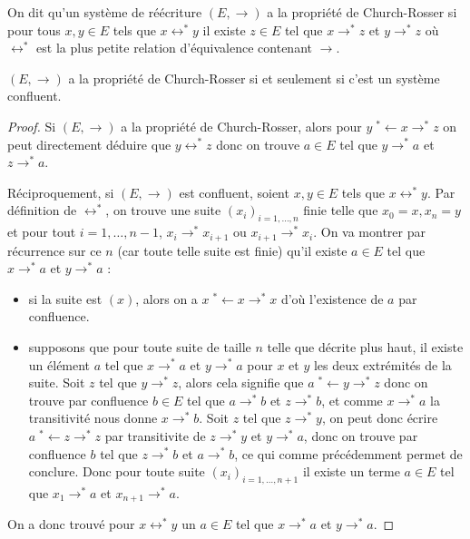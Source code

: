 \begin{defi}
    On dit qu'un système de réécriture $(E,\to)$ a la propriété de Church-Rosser si pour tous $x,y\in E$ tels que $x\leftrightarrow^* y$ il existe $z\in E$ tel que $x\to^* z$ et $y\to^* z$ où $\leftrightarrow^*$ est la plus petite relation d'équivalence contenant $\to$.
\end{defi}

\begin{prop}
    $(E,\to)$ a la propriété de Church-Rosser si et seulement si c'est un système confluent.
\end{prop}

\begin{proof}
    Si $(E,\to)$ a la propriété de Church-Rosser, alors pour $y\;^*\!\!\leftarrow x \rightarrow^* z$ on peut directement déduire que $y\leftrightarrow^* z$ donc on trouve $a\in E$ tel que $y\to^* a$ et $z\to^* a$.

    Réciproquement, si $(E,\to)$ est confluent, soient $x,y\in E$ tels que $x\leftrightarrow^* y$. Par définition de $\leftrightarrow^*$, on trouve une suite $(x_i)_{i=1,\ldots,n}$ finie telle que $x_0 = x, x_n = y$ et pour tout $i = 1,\ldots, n-1$, $x_i\to^*x_{i+1}$ ou $x_{i+1}\to^* x_i$. On va montrer par récurrence sur ce $n$ (car toute telle suite est finie) qu'il existe $a\in E$ tel que $x\to^* a$ et $y\to^* a$ :
    \begin{itemize}[label=$\bullet$]
        \item si la suite est $(x)$, alors on a $x\;^*\!\!\leftarrow x \rightarrow^* x$ d'où l'existence de $a$ par confluence.
        \item supposons que pour toute suite de taille $n$ telle que décrite plus haut, il existe un élément $a$ tel que $x\to^* a$ et $y\to^* a$ pour $x$ et $y$ les deux extrémités de la suite. Soit $z$ tel que $y\to^* z$, alors cela signifie que $a\;^*\!\!\leftarrow y \rightarrow^* z$ donc on trouve par confluence $b\in E$ tel que $a\to^* b$ et $z\to^* b$, et comme $x\to^* a$ la transitivité nous donne $x\to^*b$. Soit $z$ tel que $z\to^* y$, on peut donc écrire $a\;^*\!\!\leftarrow z \rightarrow^* z$ par transitivite de $z\to^* y$ et $y\to^* a$, donc on trouve par confluence $b$ tel que $z\to^* b$ et $a\to^* b$, ce qui comme précédemment permet de conclure. Donc pour toute suite $(x_i)_{i=1,\ldots,n+1}$ il existe un terme $a\in E$ tel que $x_1\to^* a$ et $x_{n+1}\to^* a$.
    \end{itemize}
    On a donc trouvé pour $x\leftrightarrow^* y$ un $a\in E$ tel que $x\to^* a$ et $y\to^* a$.
\end{proof}

